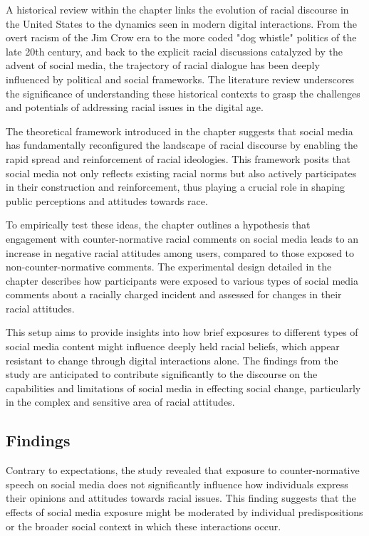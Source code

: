\documentclass[12pt]{article}[1in]
\begin{document}
A historical review within the chapter links the evolution of racial discourse in the United States to the dynamics seen in modern digital interactions. From the overt racism of the Jim Crow era to the more coded "dog whistle" politics of the late 20th century, and back to the explicit racial discussions catalyzed by the advent of social media, the trajectory of racial dialogue has been deeply influenced by political and social frameworks. The literature review underscores the significance of understanding these historical contexts to grasp the challenges and potentials of addressing racial issues in the digital age.

The theoretical framework introduced in the chapter suggests that social media has fundamentally reconfigured the landscape of racial discourse by enabling the rapid spread and reinforcement of racial ideologies. This framework posits that social media not only reflects existing racial norms but also actively participates in their construction and reinforcement, thus playing a crucial role in shaping public perceptions and attitudes towards race.

To empirically test these ideas, the chapter outlines a hypothesis that engagement with counter-normative racial comments on social media leads to an increase in negative racial attitudes among users, compared to those exposed to non-counter-normative comments. The experimental design detailed in the chapter describes how participants were exposed to various types of social media comments about a racially charged incident and assessed for changes in their racial attitudes.

This setup aims to provide insights into how brief exposures to different types of social media content might influence deeply held racial beliefs, which appear resistant to change through digital interactions alone. The findings from the study are anticipated to contribute significantly to the discourse on the capabilities and limitations of social media in effecting social change, particularly in the complex and sensitive area of racial attitudes.

\subsection*{Findings}
Contrary to expectations, the study revealed that exposure to counter-normative speech on social media does not significantly influence how individuals express their opinions and attitudes towards racial issues. This finding suggests that the effects of social media exposure might be moderated by individual predispositions or the broader social context in which these interactions occur.
\end{document}
